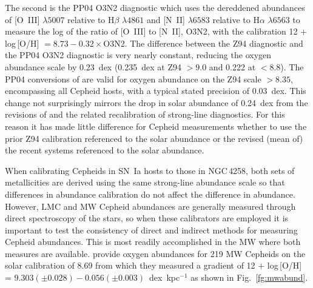 \documentclass[12pt]{aastex631}
\begin{document}
\begin{appendices}
The second is the PP04 O3N2 diagnostic which uses the dereddened abundances of [O~III] $\lambda5007$ relative to H$\beta$ $\lambda4861$ and  [N~II] $\lambda6583$ relative to H$\alpha$ $\lambda6563$ to measure the log of the ratio of [O~III] to [N~II], O3N2, with the calibration 12 + log\,[O/H] $=8.73-0.32\times$O3N2. The difference between the Z94 diagnostic and the PP04 O3N2 diagnostic is very nearly constant, reducing the oxygen abundance scale by 0.23~dex (0.235~dex at Z94 $>9.0$ and 0.222 at $<8.8$).  The PP04 conversions of  \citet{Teimoorinia:2021}  are valid for oxygen abundance on the Z94 scale $>8.35$, encompassing all Cepheid hosts, with a typical stated precision of 0.03~dex.  This change not surprisingly mirrors the drop in solar abundance of 0.24~dex from the revisions of \citet{Asplund:2005,asplund09} and the related recalibration of strong-line diagnostics. For this reason it has made little difference for Cepheid measurements whether to use the prior Z94 calibration referenced to the \citet{Anders:1989} solar abundance or the revised (mean of) the recent systems referenced to the \citet{Asplund:2005,asplund09} solar abundance.   

When calibrating Cepheids in SN~Ia hosts to those in NGC$\,$4258, both sets of metallicities are derived using the same strong-line abundance scale so that differences in abundance calibration do not affect the difference in abundance.  However, LMC and MW Cepheid abundances are generally measured through direct spectroscopy of the stars, so when these calibrators are employed it is important to test the consistency of direct and indirect methods for measuring Cepheid abundances. This is most readily accomplished in the MW where both measures are available.  \citet{Luck:2011} provide oxygen abundances for 219 MW Cepheids on the \citet{Asplund:2005} solar calibration of 8.69 from which they measured a gradient of 12 + log\,[O/H] = $9.303 (\pm 0.028)-0.056(\pm 0.003)$~dex~kpc$^{-1}$ as shown in Fig.~\ref{fg:mwabund}.


\end{appendices}
\end{document}
